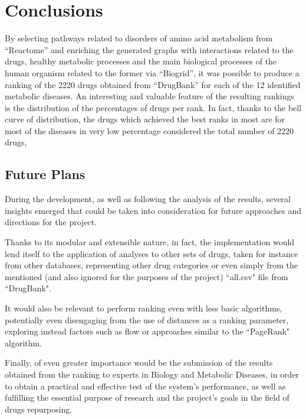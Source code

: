 \chapter{Conclusions}

By selecting pathways related to disorders of amino acid metabolism from ``Reactome'' and enriching the generated graphs with interactions related to the drugs, healthy metabolic processes and the main biological processes of the human organism related to the former via ``Biogrid'', it was possible to produce a ranking of the 2220 drugs obtained from ``DrugBank'' for each of the 12 identified metabolic diseases. 
An interesting and valuable feature of the resulting rankings is the distribution of the percentages of drugs per rank. In fact, thanks to the bell curve of distribution, the drugs which achieved the best ranks in most are for most of the diseases in very low percentage considered the total number of 2220 drugs,

\section{Future Plans}
During the development, as well as following the analysis of the results, several insights emerged that could be taken into consideration for future approaches and directions for the project.

Thanks to its modular and extensible nature, in fact, the implementation would lend itself to the application of analyses to other sets of drugs, taken for instance from other databases, representing other drug categories or even simply from the mentioned (and also ignored for the purposes of the project) ``all.csv" file from ``DrugBank".

It would also be relevant to perform ranking even with less basic algorithms, potentially even disengaging from the use of distances as a ranking parameter, exploring instead factors such as flow or approaches similar to the ``PageRank" algorithm.

Finally, of even greater importance would be the submission of the results obtained from the ranking to experts in Biology and Metabolic Diseases, in order to obtain a practical and effective test of the system's performance, as well as fulfilling the essential purpose of research and the project's goals in the field of drugs repurposing.